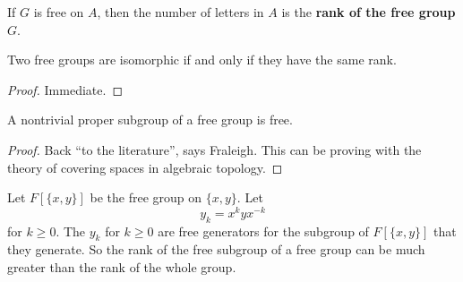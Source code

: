 \begin{definition}[Rank]
    If $G$ is free on $A$, then the number of letters in $A$ is the \textbf{rank of the free group} $G$.
\end{definition}
\begin{theorem}
    Two free groups are isomorphic if and only if they have the same rank.
\end{theorem}
\begin{proof}
    Immediate.
\end{proof}
\begin{theorem}
A nontrivial proper subgroup of a free group is free.    
\end{theorem}
\begin{proof}
    Back ``to the literature'', says Fraleigh. This can be proving with the theory of covering spaces in algebraic topology.
\end{proof}
\begin{example}
    Let $F[\{x,y\}]$ be the free group on $\{x,y\} $. Let \[
    y_k=x^{k}yx^{-k}
\] for $k \geq 0$. The $y_k$ for $k\geq 0$ are free generators for the subgroup of $F[\{x,y\}]$ that they generate. So the rank of the free subgroup of a free group can be much greater than the rank of the whole group.
\end{example}
